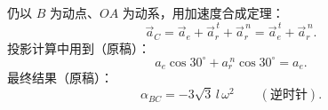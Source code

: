 \begin{longexample}

仍以 $B$ 为动点、$OA$ 为动系，用加速度合成定理：
\begin{equation}\label{eq:9-p57e1-a-sys}
  \vec{a}_C=\vec{a}_e+\vec{a}_r^{\,t}+\vec{a}_r^{\,n}
  =\vec{a}_e^{\,t}+\vec{a}_r^{\,n}.
\end{equation}
投影计算中用到（原稿）：
\begin{equation}\label{eq:9-p57e1-a-proj}
  a_e\cos 30^\circ+a_r^{\,n}\cos 30^\circ=a_e .
\end{equation}
最终结果（原稿）：
\begin{equation}\label{eq:9-p57e1-a-res}
  \alpha_{BC}=-3\sqrt{3}\,l\,\omega^{2}
  \qquad(\text{逆时针}).
\end{equation}
\end{longexample}

